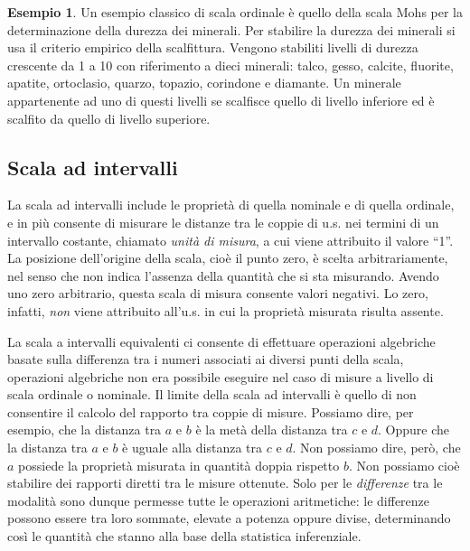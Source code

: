 \documentclass[
  11pt,
]{krantz}
\theoremstyle{definition}
\theoremstyle{definition}
\newtheorem{example}{Esempio}[chapter]
\theoremstyle{definition}
\theoremstyle{definition}
\theoremstyle{remark}
\begin{document}
\begin{example}
Un esempio classico di scala ordinale è quello della scala Mohs per la determinazione della durezza dei minerali. Per stabilire la durezza dei minerali si usa il criterio empirico della scalfittura. Vengono stabiliti livelli di durezza crescente da 1 a 10 con riferimento a dieci minerali: talco, gesso, calcite, fluorite, apatite, ortoclasio, quarzo, topazio, corindone e diamante. Un minerale appartenente ad uno di questi livelli se scalfisce quello di livello inferiore ed è scalfito da quello di livello superiore.
\end{example}

\hypertarget{scala-ad-intervalli}{%
\subsection{Scala ad intervalli}\label{scala-ad-intervalli}}

La scala ad intervalli include le proprietà di quella nominale e di quella ordinale, e in più consente di misurare le distanze tra le coppie di u.s. nei termini di un intervallo costante, chiamato \emph{unità di misura}, a cui viene attribuito il valore ``1''. La posizione dell'origine della scala, cioè il punto zero, è scelta arbitrariamente, nel senso che non indica l'assenza della quantità che si sta misurando. Avendo uno zero arbitrario, questa scala di misura consente valori negativi. Lo zero, infatti, \emph{non} viene attribuito all'u.s. in cui la proprietà misurata risulta assente.

La scala a intervalli equivalenti ci consente di effettuare operazioni algebriche basate sulla differenza tra i numeri associati ai diversi punti della scala, operazioni algebriche non era possibile eseguire nel caso di misure a livello di scala ordinale o nominale. Il limite della scala ad intervalli è quello di non consentire il calcolo del rapporto tra coppie di misure. Possiamo dire, per esempio, che la distanza tra \(a\) e \(b\) è la metà della distanza tra \(c\) e \(d\). Oppure che la distanza tra \(a\) e \(b\) è uguale alla distanza tra \(c\) e \(d\). Non possiamo dire, però, che \(a\) possiede la proprietà misurata in quantità doppia rispetto \(b\). Non possiamo cioè stabilire dei rapporti diretti tra le misure ottenute. Solo per le \emph{differenze} tra le modalità sono dunque permesse tutte le operazioni aritmetiche: le differenze possono essere tra loro sommate, elevate a potenza oppure divise, determinando così le quantità che stanno alla base della statistica inferenziale.
\end{document}
